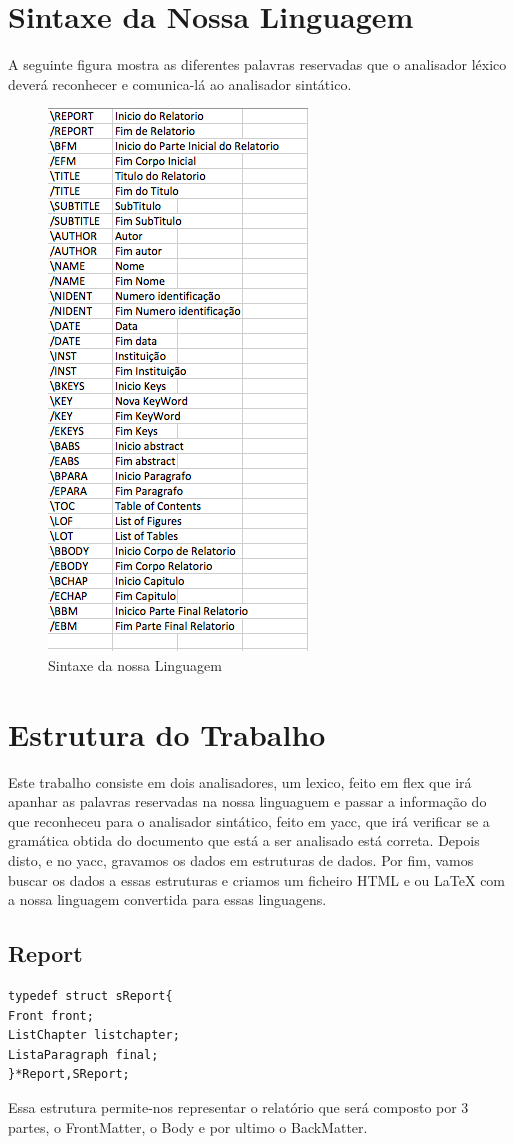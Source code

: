 \documentclass[12pt,a4paper]{report}
\begin{document}
\chapter{Sintaxe da Nossa Linguagem }
A seguinte figura mostra as diferentes palavras reservadas que o analisador léxico deverá reconhecer e comunica-lá ao analisador sintático.   
\begin{figure}\includegraphics{sintaxe.jpg}\caption{Sintaxe da nossa Linguagem }\end{figure}\chapter{Estrutura do Trabalho }
Este trabalho consiste em dois analisadores, um lexico, feito em flex que irá 
apanhar
 as palavras reservadas na nossa linguaguem e passar a informação do que reconheceu para o analisador sintático, feito em yacc, que irá verificar se a gramática obtida do documento que está a ser analisado está correta.
Depois disto, e no yacc, gravamos os dados em estruturas de dados. Por fim, vamos buscar os dados a essas estruturas e criamos um ficheiro HTML e
ou LaTeX com a nossa linguagem convertida para essas linguagens.
\section{Report }
\begin{verbatim}typedef struct sReport{
Front front;
ListChapter listchapter;
ListaParagraph final;
}*Report,SReport;  
\end{verbatim}Essa estrutura permite-nos representar o relatório que será composto por 3 partes, o FrontMatter, o Body e por ultimo o BackMatter.   
\end{document}
